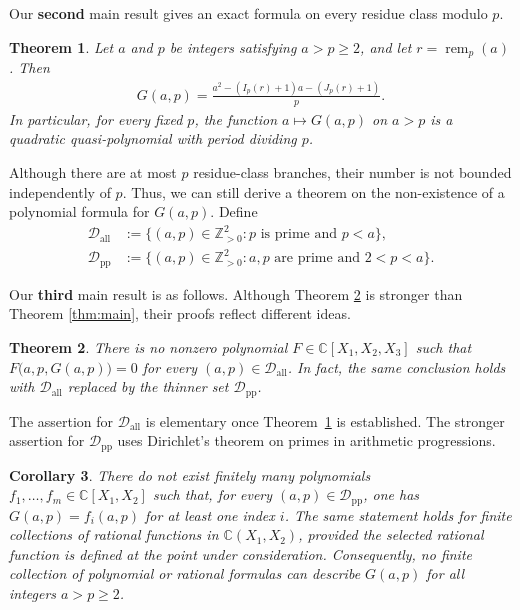 \documentclass[reqno, 12pt]{article}
\numberwithin{equation}{section}
\newtheorem{theorem}{Theorem}[section]
\newtheorem{corollary}[theorem]{Corollary}
\theoremstyle{definition}
\newcommand{\ZZ}{\mathbb{Z}}
\newcommand{\CC}{\mathbb{C}}
\newcommand{\cD}{\mathcal D}
\newcommand{\remp}{\operatorname{rem}}
\begin{document}
Our \textbf{second} main result gives an exact formula on every residue class modulo $p$.  

\begin{theorem}\label{thm:intro-exact}
Let $a$ and $p$ be integers satisfying $a>p\ge2$, and let
$r=\remp_p(a)$.  Then
\begin{align*}
  G(a,p)=\frac{a^2-(I_p(r)+1)a-(J_p(r)+1)}{p}.
\end{align*}
In particular, for every fixed $p$, the function $a\mapsto G(a,p)$ on
$a>p$ is a quadratic quasi-polynomial with period dividing $p$.
\end{theorem}

Although there are at most $p$ residue-class branches, their number is not bounded independently of $p$.
Thus, we can still derive a theorem on the non-existence of a polynomial formula for $G(a,p)$.
Define
\begin{align}
 \cD_{\mathrm{all}}&:=\{(a,p)\in\ZZ_{>0}^2:p\text{ is prime and }p<a\},\label{eq:Dall}\\
 \cD_{\mathrm{pp}}&:=\{(a,p)\in\ZZ_{>0}^2:a,p\text{ are prime and }2<p<a\}.\label{eq:Dpp}
\end{align}

Our \textbf{third} main result is as follows. Although Theorem \ref{thm:intro-reduced} is stronger than Theorem \ref{thm:main}, their proofs reflect different ideas.

\begin{theorem}\label{thm:intro-reduced}
There is no nonzero polynomial $F\in\CC[X_1,X_2,X_3]$ such that $F\bigl(a,p,G(a,p)\bigr)=0$ for every $(a,p)\in\cD_{\mathrm{all}}$. 
In fact, the same conclusion holds with $\cD_{\mathrm{all}}$ replaced by the thinner set $\cD_{\mathrm{pp}}$.
\end{theorem}

The assertion for $\cD_{\mathrm{all}}$ is elementary once Theorem~\ref{thm:intro-exact} is established.
The stronger assertion for $\cD_{\mathrm{pp}}$ uses Dirichlet's theorem on primes in arithmetic progressions.

\begin{corollary}\label{Corollary-II-PP}
There do not exist finitely many polynomials $f_1,\ldots,f_m\in\CC[X_1,X_2]$ such that, for every
$(a,p)\in\cD_{\mathrm{pp}}$, one has $G(a,p)=f_i(a,p)$ for at least one index $i$.  The same statement holds for finite collections
of rational functions in $\CC(X_1,X_2)$, provided the selected rational function is defined at the point under consideration.
Consequently, no finite collection of polynomial or rational formulas can describe $G(a,p)$ for all integers $a>p\ge2$.
\end{corollary}
\end{document}
